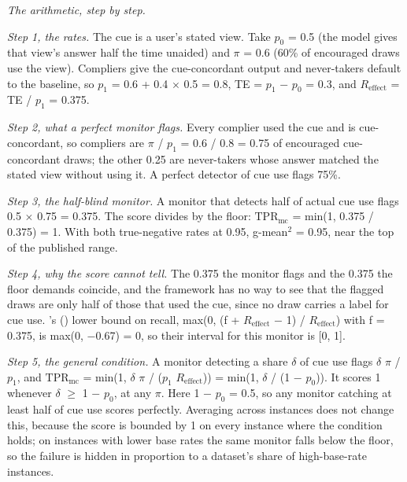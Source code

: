 \documentclass[11pt]{article}
\begin{document}
\emph{The arithmetic, step by step.}

\emph{Step 1, the rates.} The cue is a user’s stated view. Take $p_0$ = 0.5 (the model gives that view’s answer half the time unaided) and $\pi$ = 0.6 (60\% of encouraged draws use the view). Compliers give the cue-concordant output and never-takers default to the baseline, so $p_1$ = 0.6 + 0.4 $\times$ 0.5 = 0.8, TE = $p_1$ $-$ $p_0$ = 0.3, and $R_{\mathrm{effect}}$ = TE / $p_1$ = 0.375.

\emph{Step 2, what a perfect monitor flags.} Every complier used the cue and is cue-concordant, so compliers are $\pi$ / $p_1$ = 0.6 / 0.8 = 0.75 of encouraged cue-concordant draws; the other 0.25 are never-takers whose answer matched the stated view without using it. A perfect detector of cue use flags 75\%.

\emph{Step 3, the half-blind monitor.} A monitor that detects half of actual cue use flags 0.5 $\times$ 0.75 = 0.375. The score divides by the floor: $\mathrm{TPR}_{\mathrm{mc}}$ = min(1, 0.375 / 0.375) = 1. With both true-negative rates at 0.95, g-mean$^2$ = 0.95, near the top of the published range.

\emph{Step 4, why the score cannot tell.} The 0.375 the monitor flags and the 0.375 the floor demands coincide, and the framework has no way to see that the flagged draws are only half of those that used the cue, since no draw carries a label for cue use. \citeauthor*{guan2026beyond}’s (\citeyear{guan2026beyond}) lower bound on recall, max(0, (f + $R_{\mathrm{effect}}$ $-$ 1) / $R_{\mathrm{effect}}$) with f = 0.375, is max(0, $-$0.67) = 0, so their interval for this monitor is [0, 1].

\emph{Step 5, the general condition.} A monitor detecting a share $\delta$ of cue use flags $\delta$ $\pi$ / $p_1$, and $\mathrm{TPR}_{\mathrm{mc}}$ = min(1, $\delta$ $\pi$ / ($p_1$ $R_{\mathrm{effect}}$)) = min(1, $\delta$ / (1 $-$ $p_0$)). It scores 1 whenever $\delta$ $\geq$ 1 $-$ $p_0$, at any $\pi$. Here 1 $-$ $p_0$ = 0.5, so any monitor catching at least half of cue use scores perfectly. Averaging across instances does not change this, because the score is bounded by 1 on every instance where the condition holds; on instances with lower base rates the same monitor falls below the floor, so the failure is hidden in proportion to a dataset’s share of high-base-rate instances.
\end{document}
